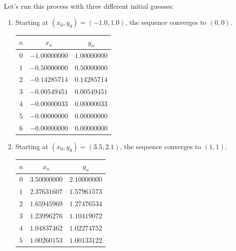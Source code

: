 \begin{example}
\begin{align*}
\end{align*}
Let's run this process with three different initial guesses:
\begin{enumerate}
	\item Starting at $(x_0, y_0) = (-1.0,1.0)$, the sequence converges to $(0,0)$.  %
	\begin{center}
	\begin{tabular}{|c|c|c|} \hline 
	$n$ & $x_n$ & $y_n$ \\ \hline \hline 
	$0$ & $-1.00000000$ & $1.00000000$ \\ \hline 
	$1$ & $-0.50000000$ & $0.50000000$ \\ \hline 
	$2$ & $-0.14285714$ & $0.14285714$ \\ \hline 
	$3$ & $-0.00549451$ & $0.00549451$ \\ \hline 
	$4$ & $-0.00000033$ & $0.00000033$ \\ \hline 
	$5$ & $-0.00000000$ & $0.00000000$ \\ \hline 
	$6$ & $-0.00000000$ & $0.00000000$ \\ \hline 
	\end{tabular}
	\end{center}
	\item Starting at $(x_0,y_0) = (3.5, 2.1)$, the sequence converges to $(1,1)$.  %
	\begin{center}
	\begin{tabular}{|c|c|c|} \hline 
	$n$ & $x_n$ & $y_n$ \\ \hline \hline 
	$0$ & $3.50000000$ & $2.10000000$ \\ \hline 
	$1$ & $2.37631607$ & $1.57961573$ \\ \hline 
	$2$ & $1.65945969$ & $1.27476534$ \\ \hline 
	$3$ & $1.23996276$ & $1.10419072$ \\ \hline 
	$4$ & $1.04837462$ & $1.02274752$ \\ \hline 
	$5$ & $1.00260153$ & $1.00133122$ \\ \hline 

\end{tabular}
\end{center}
\end{enumerate}
\end{example}
